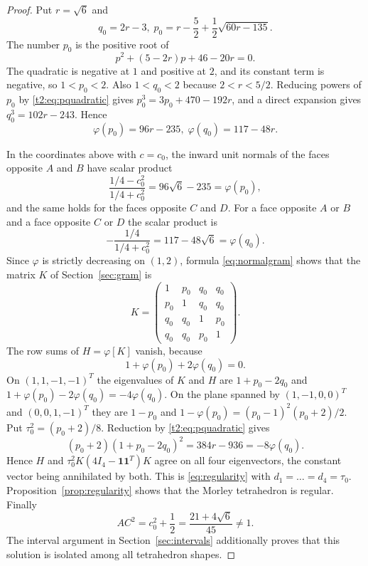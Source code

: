 \documentclass[11pt]{article}
\theoremstyle{definition}
\theoremstyle{remark}
\newcommand{\one}{\mathbf 1}
\newcommand{\ph}{\varphi}
\begin{document}
\begin{proof}
Put $r=\sqrt6$ and
\begin{equation}\label{t2:eq:exactpq}
q_0=2r-3,\;
p_0=r-\frac52+\frac12\sqrt{60r-135}.
\end{equation}
The number $p_0$ is the positive root of
\begin{equation}\label{t2:eq:pquadratic}
p^2+(5-2r)p+46-20r=0.
\end{equation}
The quadratic is negative at $1$ and positive at $2$, and its constant term is negative, so $1<p_0<2$. Also $1<q_0<2$ because $2<r<5/2$. Reducing powers of $p_0$ by \eqref{t2:eq:pquadratic} gives $p_0^3=3p_0+470-192r$, and a direct expansion gives $q_0^3=102r-243$. Hence
\begin{equation}\label{t2:eq:phi}
\ph(p_0)=96r-235,\; \ph(q_0)=117-48r.
\end{equation}

In the coordinates above with $c=c_0$, the inward unit normals of the faces opposite $A$ and $B$ have scalar product
\[
\frac{1/4-c_0^2}{1/4+c_0^2}=96\sqrt6-235=\ph(p_0),
\]
and the same holds for the faces opposite $C$ and $D$. For a face opposite $A$ or $B$ and a face opposite $C$ or $D$ the scalar product is
\[
-\frac{1/4}{1/4+c_0^2}=117-48\sqrt6=\ph(q_0).
\]
Since $\ph$ is strictly decreasing on $(1,2)$, formula \eqref{eq:normalgram} shows that the matrix $K$ of Section~\ref{sec:gram} is
\begin{equation}\label{t2:eq:K}
K=\begin{pmatrix}
1&p_0&q_0&q_0\\p_0&1&q_0&q_0\\q_0&q_0&1&p_0\\q_0&q_0&p_0&1
\end{pmatrix}.
\end{equation}
The row sums of $H=\ph[K]$ vanish, because
\begin{equation}\label{t2:eq:row}
1+\ph(p_0)+2\ph(q_0)=0.
\end{equation}
On $(1,1,-1,-1)^T$ the eigenvalues of $K$ and $H$ are $1+p_0-2q_0$ and $1+\ph(p_0)-2\ph(q_0)=-4\ph(q_0)$. On the plane spanned by $(1,-1,0,0)^T$ and $(0,0,1,-1)^T$ they are $1-p_0$ and $1-\ph(p_0)=(p_0-1)^2(p_0+2)/2$. Put $\tau_0^2=(p_0+2)/8$. Reduction by \eqref{t2:eq:pquadratic} gives
\begin{equation}\label{t2:eq:tau}
(p_0+2)(1+p_0-2q_0)^2=384r-936=-8\ph(q_0).
\end{equation}
Hence $H$ and $\tau_0^2K(4I_4-\one\one^T)K$ agree on all four eigenvectors, the constant vector being annihilated by both. This is \eqref{eq:regularity} with $d_1=\dots=d_4=\tau_0$. Proposition~\ref{prop:regularity} shows that the Morley tetrahedron is regular. Finally
\[
AC^2=c_0^2+\frac12=\frac{21+4\sqrt6}{45}\ne1.
\]
The interval argument in Section~\ref{sec:intervals} additionally proves that this solution is isolated among all tetrahedron shapes.
\end{proof}
\end{document}

